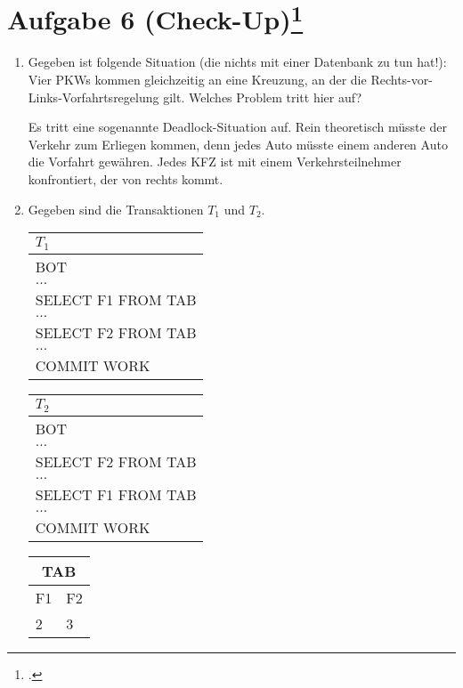 \documentclass{bschlangaul-aufgabe}
\begin{document}

\section{
Aufgabe 6 (Check-Up)\footcite[Aufgabe 6]{db:ab:6}
}

\begin{enumerate}


\item Gegeben ist folgende Situation (die nichts mit einer Datenbank zu
tun hat!): Vier PKWs kommen gleichzeitig an eine Kreuzung, an der die
Rechts-vor-Links-Vorfahrtsregelung gilt. Welches Problem tritt hier auf?

\begin{liAntwort}
Es tritt eine sogenannte Deadlock-Situation auf. Rein
theoretisch müsste der Verkehr zum Erliegen kommen, denn jedes Auto
müsste einem anderen Auto die Vorfahrt gewähren. Jedes KFZ ist mit einem
Verkehrsteilnehmer konfrontiert, der von rechts kommt.
\end{liAntwort}


\item Gegeben sind die Transaktionen $T_1$ und $T_2$.

\begin{center}
\begin{tabular}{|l|}
\hline
$T_1$ \\\hline
BOT \\\hline
$\dots$ \\\hline
SELECT F1 FROM TAB \\\hline
$\dots$ \\\hline
SELECT F2 FROM TAB \\\hline
$\dots$ \\\hline
COMMIT WORK \\\hline
\end{tabular}
%
\begin{tabular}{|l|}
\hline
$T_2$ \\\hline
BOT \\\hline
$\dots$ \\\hline
SELECT F2 FROM TAB \\\hline
$\dots$ \\\hline
SELECT F1 FROM TAB \\\hline
$\dots$ \\\hline
COMMIT WORK \\\hline
\end{tabular}
%
\begin{tabular}{|l|l|}
\hline
\multicolumn{2}{|c|}{TAB} \\\hline
F1 & F2 \\\hline
2 & 3 \\\hline
\end{tabular}
\end{center}


\end{enumerate}
\end{document}
